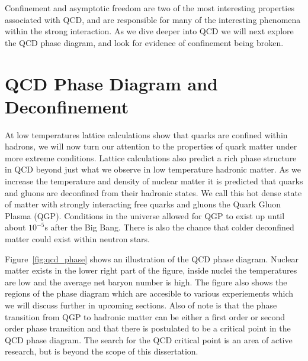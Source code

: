 Confinement and asymptotic freedom are two of the most interesting properties associated with QCD, and are responsible for many of the interesting phenomena within the strong interaction. As we dive deeper into QCD we will next explore the QCD phase diagram, and look for evidence of confinement being broken.  

\section{QCD Phase Diagram and Deconfinement}

At low temperatures lattice calculations show that quarks are confined within hadrons, we will now turn our attention to the properties of quark matter under more extreme conditions. Lattice calculations also predict a rich phase structure in QCD beyond just what we observe in low temperature hadronic matter. As we increase the temperature and density of nuclear matter it is predicted that quarks and gluons are deconfined from their hadronic states. We call this hot dense state of matter with strongly interacting free quarks and gluons the Quark Gluon Plasma (QGP). Conditions in the universe allowed for QGP to exist up until about $10^{-5}$s after the Big Bang. There is also the chance that colder deconfined matter could exist within neutron stars.

Figure~\ref{fig:qcd_phase} shows an illustration of the QCD phase diagram. Nuclear matter exists in the lower right part of the figure, inside nuclei the temperatures are low and the average net baryon number is high. The figure also shows the regions of the phase diagram which are accesible to various experiements which we will discuss further in upcoming sections. Also of note is that the phase transition from QGP to hadronic matter can be either a first order or second order phase transition and that there is postulated to be a critical point in the QCD phase diagram. The search for the QCD critical point is an area of active research, but is beyond the scope of this dissertation. 

